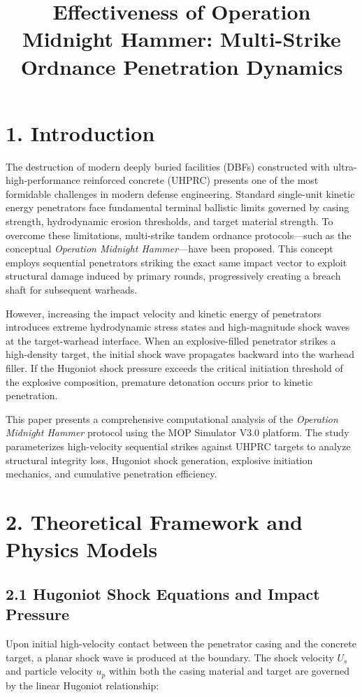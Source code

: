 \documentclass[journal,10pt,twocolumn]{IEEEtran}
\begin{document}
\title{Effectiveness of Operation Midnight Hammer: Multi-Strike Ordnance Penetration Dynamics}

\section{1. Introduction}

The destruction of modern deeply buried facilities (DBFs) constructed with ultra-high-performance reinforced concrete (UHPRC) presents one of the most formidable challenges in modern defense engineering. Standard single-unit kinetic energy penetrators face fundamental terminal ballistic limits governed by casing strength, hydrodynamic erosion thresholds, and target material strength. To overcome these limitations, multi-strike tandem ordnance protocols---such as the conceptual \emph{Operation Midnight Hammer}---have been proposed. This concept employs sequential penetrators striking the exact same impact vector to exploit structural damage induced by primary rounds, progressively creating a breach shaft for subsequent warheads.

However, increasing the impact velocity and kinetic energy of penetrators introduces extreme hydrodynamic stress states and high-magnitude shock waves at the target-warhead interface. When an explosive-filled penetrator strikes a high-density target, the initial shock wave propagates backward into the warhead filler. If the Hugoniot shock pressure exceeds the critical initiation threshold of the explosive composition, premature detonation occurs prior to kinetic penetration.

This paper presents a comprehensive computational analysis of the \emph{Operation Midnight Hammer} protocol using the MOP Simulator V3.0 platform. The study parameterizes high-velocity sequential strikes against UHPRC targets to analyze structural integrity loss, Hugoniot shock generation, explosive initiation mechanics, and cumulative penetration efficiency.



\section{2. Theoretical Framework and Physics Models}

\subsection{2.1 Hugoniot Shock Equations and Impact Pressure}
Upon initial high-velocity contact between the penetrator casing and the concrete target, a planar shock wave is produced at the boundary. The shock velocity $U_s$ and particle velocity $u_p$ within both the casing material and target are governed by the linear Hugoniot relationship:
\end{document}
